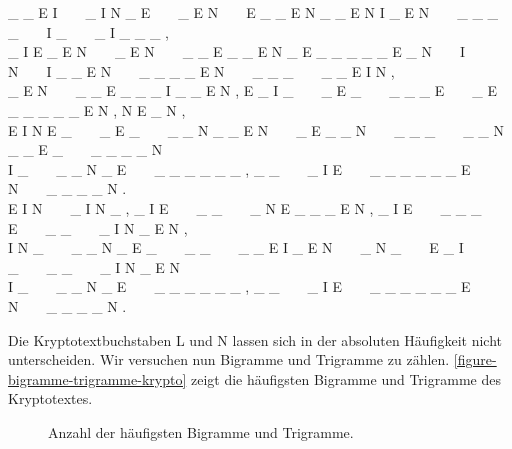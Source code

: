 \begin{example}
\vfill

\resetlinenumber[1]
\begin{linenumbers}
\small
\_ \_ E I~~~~\_ I N \_ E~~~~\_ E N~~~~E \_ \_ E N \_ \_ E N I \_ E N~~~~\_ \_ \_ \_~~~~I \_~~~~\_ I \_ \_ \_ ,\\
\_ I E \_ E N~~~~\_ E N~~~~\_ \_ E \_ \_ E N \_ E \_ \_ \_ \_ \_ E \_ N~~~~I N~~~~I \_ \_ E N~~~~\_ \_ \_ \_ E N~~~~\_ \_ \_~~~~\_ \_ E I N ,\\
\_ E N~~~~\_ \_ E \_ \_ \_ I \_ \_ E N , E \_ I \_~~~~\_ E \_~~~~\_ \_ \_ E~~~~\_ E \_ \_ \_ \_ \_ E N , N E \_ N ,\\
E I N E \_~~~~\_ E \_~~~~\_ \_ N \_ \_ E N~~~~\_ E \_ \_ N~~~~\_ \_ \_~~~~\_ \_ N \_ \_ E \_~~~~\_ \_ \_ \_ N \\
I \_~~~~\_ \_ N \_ E~~~~\_ \_ \_ \_ \_ \_ , \_ \_~~~~\_ I E~~~~\_ \_ \_ \_ \_ \_ E N~~~~\_ \_ \_ \_ N .\\
E I N~~~~\_ I N \_ , \_ I E~~~~\_ \_~~~~\_ N E \_ \_ \_ E N , \_ I E~~~~\_ \_ \_ E~~~~\_ \_~~~~\_ I N \_ E N ,\\
I N \_~~~~\_ \_ N \_ E \_~~~~\_ \_~~~~\_ \_ E I \_ E N~~~~\_ N \_~~~~E \_ I \_~~~~\_ \_~~~~\_ I N \_ E N \\
I \_~~~~\_ \_ N \_ E~~~~\_ \_ \_ \_ \_ \_ , \_ \_~~~~\_ I E~~~~\_ \_ \_ \_ \_ \_ E N~~~~\_ \_ \_ \_ N .
\end{linenumbers}

\vfill

Die Kryptotextbuchstaben L und N lassen sich in der absoluten Häufigkeit nicht unterscheiden. Wir versuchen nun Bigramme und Trigramme zu zählen. \autoref{figure-bigramme-trigramme-krypto} zeigt die häufigsten Bigramme und Trigramme des Kryptotextes.

\begin{figure}[htb]
\centering
\begin{minipage}{0.45\textwidth}
\centering
{}
\end{minipage}
\hfill
\begin{minipage}{0.45\textwidth}	
\centering
{}
\end{minipage}
\caption{Anzahl der häufigsten Bigramme und Trigramme.}
\label{figure-bigramme-trigramme-krypto}
\end{figure}


\end{example}
